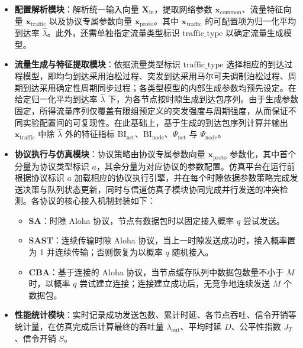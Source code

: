 \begin{itemize}[leftmargin=*]
	\item \textbf{配置解析模块}：解析统一输入向量 $\mathbf{X}_{\mathrm{in}}$，提取网络参数 $\mathbf{x}_{\text{common}}$、流量特征向量 $\mathbf{x}_{\text{traffic}}$ 以及协议专属参数向量 $\mathbf{x}_{\mathrm{proto}}$。其中 $\mathbf{x}_{\text{traffic}}$ 的可配置项为归一化平均到达率 $\hat{\lambda}$。此外，还需单独指定流量类型标识 $\text{traffic\_type}$ 以确定流量生成模型。

	\item \textbf{流量生成与特征提取模块}：依据流量类型标识 $\text{traffic\_type}$ 选择相应的到达过程模型，即均匀到达采用泊松过程、突发到达采用马尔可夫调制泊松过程、周期到达采用确定性周期同步过程；各类型模型的内部生成参数均预先设定。在给定归一化平均到达率 $\hat{\lambda}$ 下，为各节点按时隙生成到达包序列。由于生成参数固定，所得流量序列仅覆盖有限组预定义的突发强度与周期强度，从而保证不同实验配置间的可复现性。在此基础上，基于生成的到达包序列计算并输出 $\mathbf{x}_{\text{traffic}}$ 中除 $\hat{\lambda}$ 外的特征指标 $\mathrm{BI}_{\mathrm{net}}$、$\mathrm{BI}_{\mathrm{node}}$、$\Psi_{\mathrm{net}}$ 与 $\Psi_{\mathrm{node}}$。

	\item \textbf{协议执行与仿真模块}：协议策略由协议专属参数向量 $\mathbf{x}_{\mathrm{proto}}$ 参数化，其中首个分量为协议类型标识 $a$，其余分量为对应协议的参数配置。仿真平台在运行前根据协议标识 $a$ 加载相应的协议执行引擎，并在每个时隙依据参数策略完成发送决策与队列状态更新，同时与信道仿真子模块协同完成并行发送的冲突检测。各协议的核心接入机制封装如下：
	\begin{itemize}[leftmargin=*, itemsep=0.2em]
		\item \textbf{SA}：时隙 Aloha 协议，节点有数据包时以固定接入概率 $q$ 尝试发送。
		\item \textbf{SAST}：连续传输时隙 Aloha 协议，当上一时隙发送成功时，接入概率置为 1 并连续传输；否则恢复为以概率 $q$ 随机接入。
		\item \textbf{CBA}：基于连接的 Aloha 协议，当节点缓存队列中数据包数量不小于 $M$ 时，以概率 $q$ 尝试建立连接；连接建立成功后，无竞争地连续发送 $M$ 个数据包。
	\end{itemize}

	\item \textbf{性能统计模块}：实时记录成功发送包数、累计时延、各节点吞吐、信令开销等统计量，在仿真完成后计算最终的吞吐量 $\lambda_{\mathrm{out}}$、平均时延 $D$、公平性指数 $J_T$、信令开销 $S$。
\end{itemize}

